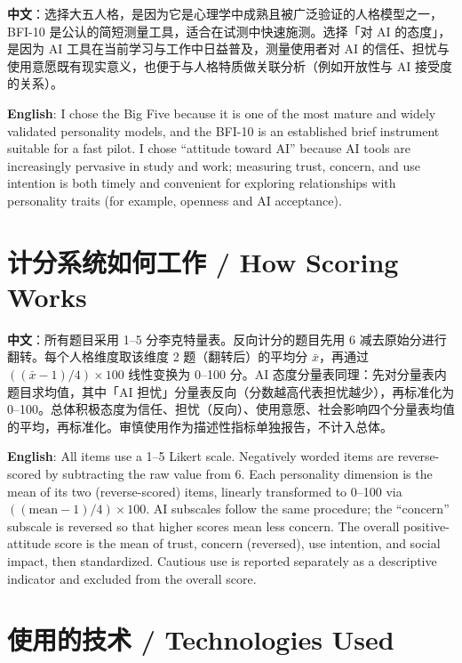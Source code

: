 \documentclass[11pt,a4paper]{ctexart}
\begin{document}
\noindent\textbf{中文}：选择大五人格，是因为它是心理学中成熟且被广泛验证的人格模型之一，BFI-10 是公认的简短测量工具，适合在试测中快速施测。选择「对 AI 的态度」，是因为 AI 工具在当前学习与工作中日益普及，测量使用者对 AI 的信任、担忧与使用意愿既有现实意义，也便于与人格特质做关联分析（例如开放性与 AI 接受度的关系）。

\medskip

\noindent\textbf{English}: I chose the Big Five because it is one of the most mature and widely validated personality models, and the BFI-10 is an established brief instrument suitable for a fast pilot. I chose ``attitude toward AI'' because AI tools are increasingly pervasive in study and work; measuring trust, concern, and use intention is both timely and convenient for exploring relationships with personality traits (for example, openness and AI acceptance).

\section{计分系统如何工作 / How Scoring Works}

\noindent\textbf{中文}：所有题目采用 1--5 分李克特量表。反向计分的题目先用 $6$ 减去原始分进行翻转。每个人格维度取该维度 2 题（翻转后）的平均分 $\bar{x}$，再通过 $((\bar{x}-1)/4)\times 100$ 线性变换为 0--100 分。AI 态度分量表同理：先对分量表内题目求均值，其中「AI 担忧」分量表反向（分数越高代表担忧越少），再标准化为 0--100。总体积极态度为信任、担忧（反向）、使用意愿、社会影响四个分量表均值的平均，再标准化。审慎使用作为描述性指标单独报告，不计入总体。

\medskip

\noindent\textbf{English}: All items use a 1--5 Likert scale. Negatively worded items are reverse-scored by subtracting the raw value from 6. Each personality dimension is the mean of its two (reverse-scored) items, linearly transformed to 0--100 via $((\mathrm{mean}-1)/4)\times 100$. AI subscales follow the same procedure; the ``concern'' subscale is reversed so that higher scores mean less concern. The overall positive-attitude score is the mean of trust, concern (reversed), use intention, and social impact, then standardized. Cautious use is reported separately as a descriptive indicator and excluded from the overall score.

\section{使用的技术 / Technologies Used}
\end{document}

